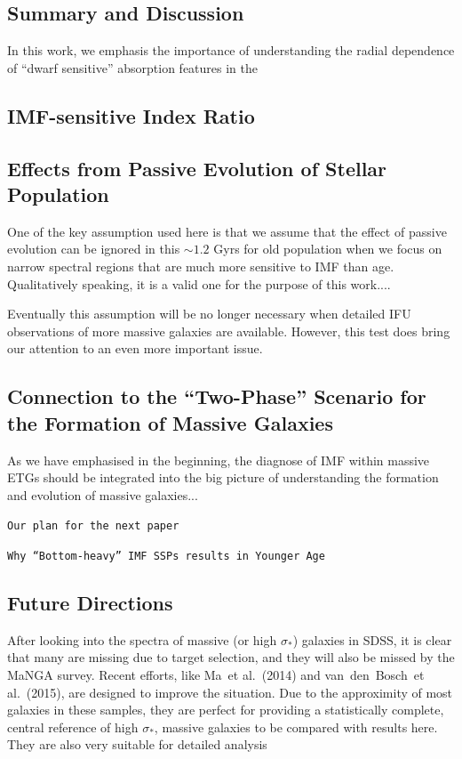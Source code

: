 \documentclass[preprint]{aastex}
\def\etal{{\ et al.~}}
\def\sigstar{$\sigma_{\ast}$}
\begin{document}
\begin{CJK*}{UTF8}{gbsn}
\section{Summary and Discussion} 

  In this work, we emphasis the importance of understanding the radial 
  dependence of ``dwarf sensitive'' absorption features in the 
  
\subsection{IMF-sensitive Index Ratio}

\subsection{Effects from Passive Evolution of Stellar Population}
  
  One of the key assumption used here is that we assume that the effect of 
  passive evolution can be ignored in this $\sim 1.2$ Gyrs for old population
  when we focus on narrow spectral regions that are much more sensitive to 
  IMF than age.  Qualitatively speaking, it is a valid one for the purpose of 
  this work....
  
  Eventually this assumption will be no longer necessary when detailed IFU 
  observations of more massive galaxies are available.  However, this test 
  does bring our attention to an even more important issue.  
   
\subsection{Connection to the ``Two-Phase'' Scenario for the Formation 
of Massive Galaxies}
  
  As we have emphasised in the beginning, the diagnose of IMF within massive 
  ETGs should be integrated into the big picture of understanding the formation 
  and evolution of massive galaxies...
  
  {\tt Our plan for the next paper}
  
  {\tt Why ``Bottom-heavy'' IMF SSPs results in Younger Age}
  
\subsection{Future Directions}
  
  After looking into the spectra of massive (or high \sigstar) galaxies in SDSS, 
  it is clear that many are missing due to target selection, and they will also 
  be missed by the MaNGA survey.  Recent efforts, like Ma\etal (2014) and 
  van~den~Bosch\etal (2015), are designed to improve the situation.  Due to the 
  approximity of most galaxies in these samples, they are perfect for providing 
  a statistically complete, central reference of high \sigstar, massive galaxies 
  to be compared with results here.  They are also very suitable for detailed 
  analysis 


\end{CJK*}
\end{document}
